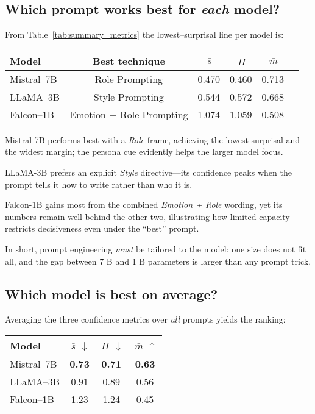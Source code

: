 \documentclass[12pt]{article}
\begin{document}
\subsection{Which prompt works best for \emph{each} model?}

From Table~\ref{tab:summary_metrics} the lowest–surprisal line per model is:

\begin{center}
\begin{tabular}{lccccc}
\toprule
\textbf{Model} & \textbf{Best technique} & $\,\bar s$ & $\,\bar H$ & $\,\bar m$ \\
\midrule
Mistral--7B  & Role Prompting           & 0.470 & 0.460 & 0.713 \\
LLaMA--3B    & Style Prompting          & 0.544 & 0.572 & 0.668 \\
Falcon--1B   & Emotion + Role Prompting & 1.074 & 1.059 & 0.508 \\
\bottomrule
\end{tabular}
\end{center}

Mistral-7B performs best with a \textit{Role} frame, achieving the lowest surprisal and the widest margin; the persona cue evidently helps the larger model focus.

LLaMA-3B prefers an explicit \textit{Style} directive—its confidence peaks when the prompt tells it how to write rather than who it is.

Falcon-1B gains most from the combined \textit{Emotion + Role} wording, yet its numbers remain well behind the other two, illustrating how limited capacity restricts decisiveness even under the “best” prompt.

In short, prompt engineering \emph{must} be tailored to the model: one size does not fit all, and the gap between 7 B and 1 B parameters is larger than any prompt trick.

\subsection{Which model is best on average?}

Averaging the three confidence metrics over \emph{all} prompts yields the ranking:

\begin{center}
\begin{tabular}{lccc}
\toprule
\textbf{Model} & $\,\bar s$ $\downarrow$ & $\,\bar H$ $\downarrow$ & $\,\bar m$ $\uparrow$ \\
\midrule
Mistral--7B  & \textbf{0.73} & \textbf{0.71} & \textbf{0.63} \\
LLaMA--3B    & 0.91 & 0.89 & 0.56 \\
Falcon--1B   & 1.23 & 1.24 & 0.45 \\
\bottomrule
\end{tabular}
\end{center}
\end{document}

